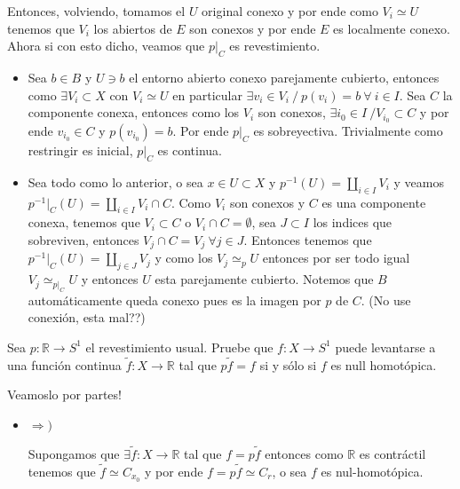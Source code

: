 \documentclass[11pt]{article}
\newcommand{\R}{{\mathbb{R}}}
\newenvironment{proof}[1][Demostraci\'on]{\begin{trivlist}
\item[\hskip \labelsep {\bfseries #1}]}{\end{trivlist}}
\newcommand{\qed}{\nobreak \ifvmode \relax \else
      \ifdim\lastskip<1.5em \hskip-\lastskip
      \hskip1.5em plus0em minus0.5em \fi \nobreak
      \vrule height0.75em width0.5em depth0.25em\fi}
\begin{document}
\begin{enumerate}
\begin{proof}
Entonces, volviendo, tomamos el $U$ original conexo y por ende como $V_i \simeq U$ tenemos que $V_i$ los abiertos de $E$ son conexos y por ende $E$ es localmente conexo. Ahora si con esto dicho, veamos que $p|_C$ es revestimiento.

\begin{itemize}

\item Sea $b \in B$ y $U \ni b$ el entorno abierto conexo parejamente cubierto, entonces como $\exists V_i \subset X$ con $V_i \simeq U$ en particular $\exists v_i \in V_i \ / \ p(v_i)=b \ \forall \ i \in I$. Sea $C$ la componente conexa, entonces como los $V_i$ son conexos, $\exists i_0 \in I \ / V_{i_0} \subset C$ y por ende $v_{i_0} \in C$ y $p(v_{i_0})=b$. Por ende $p|_C$ es sobreyectiva. Trivialmente como restringir es inicial, $p|_C$ es continua.

\item Sea todo como lo anterior, o sea $x \in U \subset X$ y $p^{-1}(U)= \coprod_{i \in I}{V_i}$ y veamos $p^{-1}|_C(U) = \coprod_{i \in I}{V_i \cap C}$. Como $V_i$ son conexos y $C$ es una componente conexa, tenemos que $V_i \subset C$ o $V_i \cap C = \emptyset$, sea $J \subset I$ los indices que sobreviven, entonces $V_j \cap C = V_j \ \forall j \in J$. Entonces tenemos que $p^{-1}|_C(U) = \coprod_{j \in J}{V_j}$ y como los $V_j \simeq_p U$ entonces por ser todo igual $V_j \simeq_{p|_{C}} U$ y entonces $U$ esta parejamente cubierto. Notemos que $B$ autom\'aticamente queda conexo pues es la imagen por $p$ de $C$. (No use conexi\'on, esta mal??) \qed

\end{itemize}

\end{proof}

\item {Sea $p : \R\to S^1$ el revestimiento usual.
Pruebe que $f : X  \to S^1$ puede levantarse a una funci\'on continua $\tilde f : X \to \R$ tal que $p\tilde f = f$ si y s\'olo si $f$ es
null homot\'opica.}

\begin{proof}

Veamoslo por partes!

\begin{itemize}

\item {$\Longrightarrow)$}

Supongamos que $\exists \widetilde{f}:X \rightarrow \R$ tal que $f =  p\widetilde{f}$ entonces como $\R$ es contr\'actil tenemos que $\widetilde{f} \simeq C_{x_0}$ y por ende $f = p\widetilde{f} \simeq C_{r}$, o sea $f$ es nul-homot\'opica.


\end{itemize}
\end{proof}
\end{enumerate}
\end{document}
